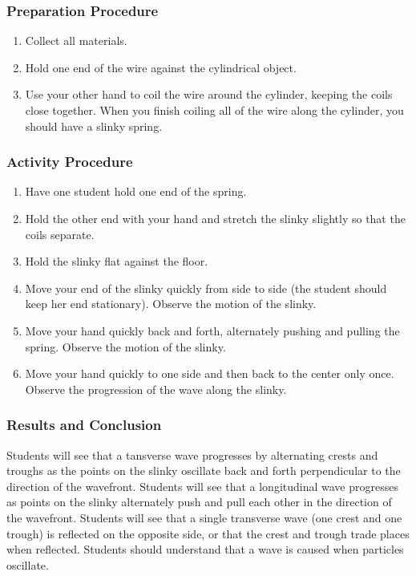 \subsubsection*{Preparation Procedure}
\begin{enumerate}
\item{Collect all materials.} 
\item{Hold one end of the wire against the cylindrical object.} 
\item{Use your other hand to coil the wire around the cylinder, keeping the coils close together. When you finish coiling all of the wire along the cylinder, you should have a slinky spring.} 
\end{enumerate}

\subsubsection*{Activity Procedure}
\begin{enumerate}
\item{Have one student hold one end of the spring.} 
\item{Hold the other end with your hand and stretch the slinky slightly so that the coils separate.} 
\item{Hold the slinky flat against the floor.} 
\item{Move your end of the slinky quickly from side to side (the student should keep her end stationary). Observe the motion of the slinky.} 
\item{Move your hand quickly back and forth, alternately pushing and pulling the spring. Observe the motion of the slinky.} 
\item{Move your hand quickly to one side and then back to the center only once. Observe the progression of the wave along the slinky.} 
\end{enumerate}

\subsubsection*{Results and Conclusion}
Students will see that a tansverse wave progresses by alternating crests and troughs as the points on the slinky oscillate back and forth perpendicular to the direction of the wavefront.  
Students will see that a longitudinal wave progresses as points on the slinky alternately push and pull each other in the direction of the wavefront.  
Students will see that a single transverse wave (one crest and one trough) is reflected on the opposite side, or that the crest and trough trade places when reflected.  
Students should understand that a wave is caused when particles oscillate.  

